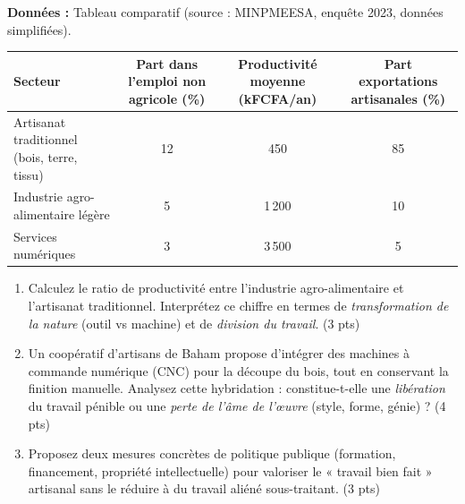 \documentclass[11pt]{article}
\begin{document}
\begin{exercice}
\textbf{Données :} Tableau comparatif (source : MINPMEESA, enquête 2023, données simplifiées).
\begin{center}
\begin{tabular}{|l|c|c|c|}
\hline
\textbf{Secteur} & \textbf{Part dans l'emploi non agricole (\%)} & \textbf{Productivité moyenne (kFCFA/an)} & \textbf{Part exportations artisanales (\%)} \\
\hline
Artisanat traditionnel (bois, terre, tissu) & 12 & 450 & 85 \\
Industrie agro-alimentaire légère & 5 & 1\,200 & 10 \\
Services numériques & 3 & 3\,500 & 5 \\
\hline
\end{tabular}
\end{center}
\begin{enumerate}
    \item Calculez le ratio de productivité entre l'industrie agro-alimentaire et l'artisanat traditionnel. Interprétez ce chiffre en termes de \textit{transformation de la nature} (outil vs machine) et de \textit{division du travail}. (3 pts)
    \item Un coopératif d'artisans de Baham propose d'intégrer des machines à commande numérique (CNC) pour la découpe du bois, tout en conservant la finition manuelle. Analysez cette hybridation : constitue-t-elle une \textit{libération} du travail pénible ou une \textit{perte de l'âme de l'œuvre} (style, forme, génie) ? (4 pts)
    \item Proposez deux mesures concrètes de politique publique (formation, financement, propriété intellectuelle) pour valoriser le « travail bien fait » artisanal sans le réduire à du travail aliéné sous-traitant. (3 pts)
\end{enumerate}
\end{exercice}
\end{document}
